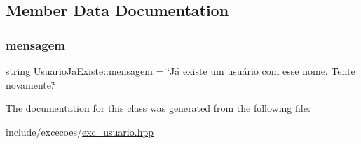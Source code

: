 \subsection{Member Data Documentation}
\mbox{\label{classUsuarioJaExiste_abd00539263f588798844b87f64eab9a7}} 
\subsubsection{\texorpdfstring{mensagem}{mensagem}}
{\footnotesize\ttfamily string Usuario\+Ja\+Existe\+::mensagem = \char`\"{}Já existe um usuário com esse nome. Tente novamente.\char`\"{}\hspace{0.3cm}{\ttfamily [private]}}



The documentation for this class was generated from the following file\+:\begin{DoxyCompactItemize}
\item 
include/excecoes/\hyperlink{exc__usuario_8hpp}{exc\+\_\+usuario.\+hpp}\end{DoxyCompactItemize}

